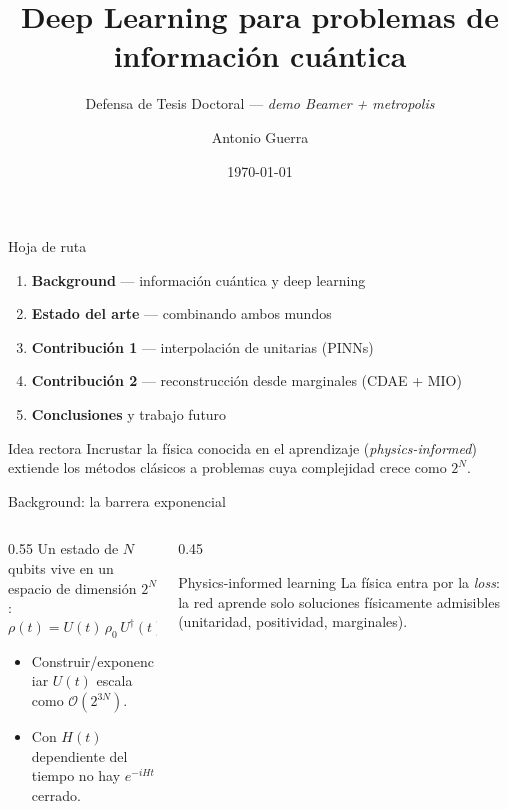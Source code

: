 \documentclass[11pt,aspectratio=169]{beamer}
\title{Deep Learning para problemas de información cuántica}
\subtitle{Defensa de Tesis Doctoral --- \textit{demo Beamer + metropolis}}
\author{Antonio Guerra}
\institute{Universidad de Concepción}
\date{\today}
\begin{document}
\maketitle

\begin{frame}{Hoja de ruta}
  \begin{enumerate}
    \item \textbf{Background} --- información cuántica y deep learning
    \item \textbf{Estado del arte} --- combinando ambos mundos
    \item \textbf{Contribución 1} --- interpolación de unitarias (PINNs)
    \item \textbf{Contribución 2} --- reconstrucción desde marginales (CDAE + MIO)
    \item \textbf{Conclusiones} y trabajo futuro
  \end{enumerate}

  \vspace{1em}
  \begin{alertblock}{Idea rectora}
    Incrustar la física conocida en el aprendizaje (\emph{physics-informed})
    extiende los métodos clásicos a problemas cuya complejidad crece como $2^N$.
  \end{alertblock}
\end{frame}

\begin{frame}{Background: la barrera exponencial}
  \begin{columns}[T]
    \begin{column}{0.55\textwidth}
      Un estado de $N$ qubits vive en un espacio de dimensión $2^N$:
      \[
        \rho(t) = U(t)\,\rho_0\,U^{\dagger}(t), \qquad
        i\,\dot U = H(t)\,U .
      \]
      \begin{itemize}
        \item Construir/exponenciar $U(t)$ escala como $\mathcal{O}(2^{3N})$.
        \item Con $H(t)$ dependiente del tiempo no hay $e^{-iHt}$ cerrado.
      \end{itemize}
    \end{column}
    \begin{column}{0.45\textwidth}
      \begin{block}{Physics-informed learning}
        La física entra por la \emph{loss}: la red aprende solo soluciones
        físicamente admisibles (unitaridad, positividad, marginales).
      \end{block}
    \end{column}
  \end{columns}
\end{frame}
\end{document}
